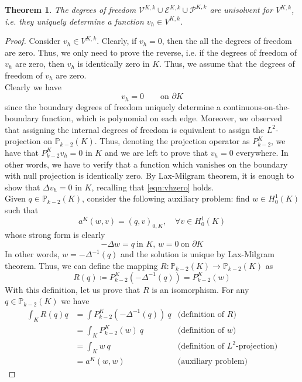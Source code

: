 \documentclass[10pt]{article}
\newtheorem{theorem}{Theorem}
\begin{document}
\begin{theorem}
	The degrees of freedom $\mathcal{V}^{K,k} \cup \mathcal{E}^{K,k} \cup \mathcal{P}^{K,k}$ are unisolvent for $V^{K,k}$, i.e. they uniquely determine a function $v_h \in V^{K,k}$.
\end{theorem}
\begin{proof}
	Consider $v_h \in V^{K,k}$. Clearly, if $v_h = 0$, then the all the degrees of freedom are zero. Thus, we only need to prove the reverse, i.e. if the degrees of freedom of $v_h$ are zero, then $v_h$ is identically zero in $K$. Thus, we assume that the degrees of freedom of $v_h$ are zero.\\
	Clearly we have 
	\begin{equation}
		v_h=0 \qquad \text{on } \partial K
		\label{eqn:vhzero}
	\end{equation}
	since the boundary degrees of freedom uniquely determine a continuous-on-the-boundary function, which is polynomial on each edge. Moreover, we observed that assigning the internal degrees of freedom is equivalent to assign the $L^2$-projection on $\mathbb{P}_{k-2}(K)$. Thus, denoting the projection operator as $P^K_{k-2}$, we have that $P^K_{k-2}v_h=0$ in $K$ and we are left to prove that $v_h=0$ everywhere. In other words, we have to verify that a function which vanishes on the boundary with null projection is identically zero. By Lax-Milgram theorem, it is enough to show that $\Delta v_h=0$ in $K$, recalling that \eqref{eqn:vhzero} holds. \\
	Given $q \in \mathbb{P}_{k-2}(K)$, consider the following auxiliary problem: find $w \in H_0^1(K)$ such that
	$$a^K(w,v)=(q,v)_{0,K}, \quad \forall v \in H_0^1(K)$$
	whose strong form is clearly $$-\Delta w = q \ \text{in } K, \, w=0 \ \text{on } \partial K$$
	In other words, $w=-\Delta^{-1}(q)$ and the solution is unique by Lax-Milgram theorem. Thus, we can define the mapping $R: \mathbb{P}_{k-2}(K) \rightarrow \mathbb{P}_{k-2}(K)$ as $$R(q) \coloneqq P^K_{k-2}(-\Delta^{-1}(q))=P^K_{k-2}(w)$$
	With this definition, let us prove that $R$ is an isomorphism. For any $q \in \mathbb{P}_{k-2}(K)$ we have
	\begin{align*}
	\int_{K} R(q) q &= \int P^K_{k-2}(-\Delta^{-1}(q)) \ q  & \text{(definition of $R$)}\\
	&= \int_K P^K_{k-2}(w) \ q  & \text{(definition of $w$)}\\
	&= \int_K w \ q & \text{(definition of $L^2$-projection)}\\
	&=a^K(w,w)   & \text{(auxiliary problem)} 
	\end{align*}

\end{proof}
\end{document}
